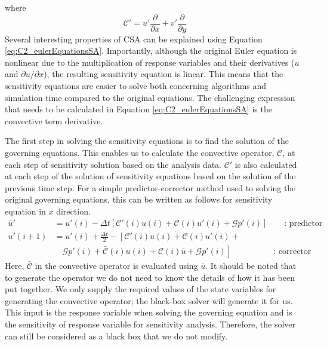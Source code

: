 %
where
%
\begin{equation*}
    \mathcal{C}' = u' \frac{\partial}{\partial x} + v' \frac{\partial}{\partial y}
\end{equation*}
%
Several interesting properties of CSA can be explained using Equation \eqref{eq:C2_eulerEquationsSA}. Importantly, although the original Euler equation is nonlinear due to the multiplication of response variables and their derivatives ($u$ and $\partial u/\partial x$), the resulting sensitivity equation is linear. This means that the sensitivity equations are easier to solve both concerning algorithms and simulation time compared to the original equations. The challenging expression that needs to be calculated in Equation \eqref{eq:C2_eulerEquationsSA} is the convective term derivative.

The first step in solving the sensitivity equations is to find the solution of the governing equations. This enables us to calculate the convective operator, $\mathcal{C}$, at each step of sensitivity solution based on the analysis data. $\mathcal{C}'$ is also calculated at each step of the solution of sensitivity equations based on the solution of the previous time step. For a simple predictor-corrector method used to solving the original governing equations, this can be written as follows for sensitivity equation in $x$ direction.
%
\begin{align*}
    \bar{u}' &= u'(i) - 
    \Delta t \left[ \mathcal{C}'(i) u(i) + \mathcal{C}(i) u'(i) + \mathcal{G} p'(i) \right]
    \qquad \text{: predictor}
    \\
    u'(i+1) &= u'(i) + \frac{\Delta t}{2} - 
    \left[ \mathcal{C}'(i) u(i) + \mathcal{C}(i) u'(i) + \right. \\
    &\quad \left.  \mathcal{G} p'(i) + \bar{\mathcal{C}}(i) u(i) + \mathcal{C}(i) \bar{u} + \mathcal{G} p'(i)\right]
    \qquad \qquad \quad \text{: corrector}
\end{align*}
%
Here, $\bar{\mathcal{C}}$ in the convective operator is evaluated using $\bar{u}$. It should be noted that to generate the operator we do not need to know the details of how it has been put together. We only supply the required values of the state variables for generating the convective operator; the black-box solver will generate it for us. This input is the response variable when solving the governing equation and is the sensitivity of response variable for sensitivity analysis. Therefore, the solver can still be considered as a black box that we do not modify.
